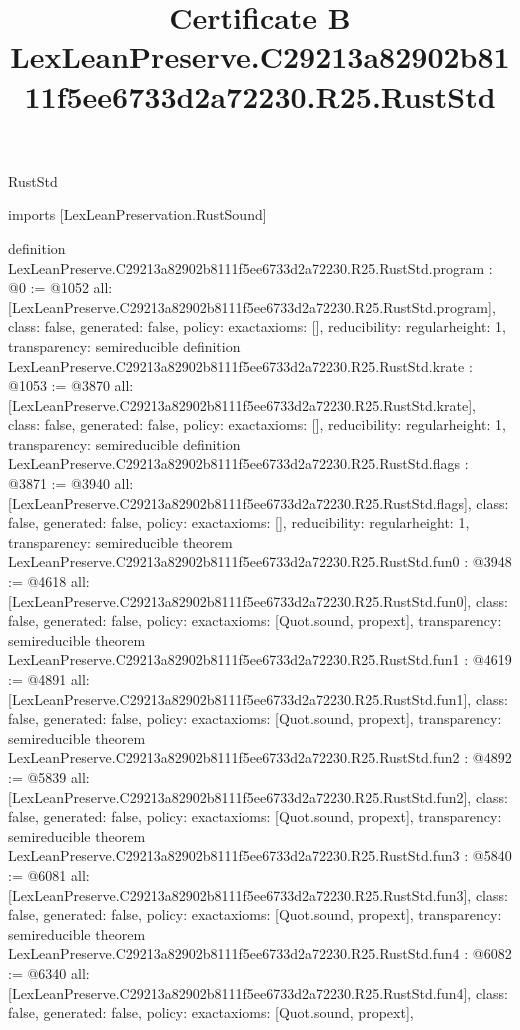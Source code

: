 \begin{lexlean}{RustStd}
\title{Certificate B LexLeanPreserve.C29213a82902b8111f5ee6733d2a72230.R25.RustStd}
\begin{coremodule}
imports [LexLeanPreservation.RustSound]

definition LexLeanPreserve.C29213a82902b8111f5ee6733d2a72230.R25.RustStd.program : @0 := @1052 {
  all: [LexLeanPreserve.C29213a82902b8111f5ee6733d2a72230.R25.RustStd.program],
  class: false,
  generated: false,
  policy: exact{axioms: []},
  reducibility: regular{height: 1},
  transparency: semireducible
}
definition LexLeanPreserve.C29213a82902b8111f5ee6733d2a72230.R25.RustStd.krate : @1053 := @3870 {
  all: [LexLeanPreserve.C29213a82902b8111f5ee6733d2a72230.R25.RustStd.krate],
  class: false,
  generated: false,
  policy: exact{axioms: []},
  reducibility: regular{height: 1},
  transparency: semireducible
}
definition LexLeanPreserve.C29213a82902b8111f5ee6733d2a72230.R25.RustStd.flags : @3871 := @3940 {
  all: [LexLeanPreserve.C29213a82902b8111f5ee6733d2a72230.R25.RustStd.flags],
  class: false,
  generated: false,
  policy: exact{axioms: []},
  reducibility: regular{height: 1},
  transparency: semireducible
}
theorem LexLeanPreserve.C29213a82902b8111f5ee6733d2a72230.R25.RustStd.fun0 : @3948 := @4618 {
  all: [LexLeanPreserve.C29213a82902b8111f5ee6733d2a72230.R25.RustStd.fun0],
  class: false,
  generated: false,
  policy: exact{axioms: [Quot.sound, propext]},
  transparency: semireducible
}
theorem LexLeanPreserve.C29213a82902b8111f5ee6733d2a72230.R25.RustStd.fun1 : @4619 := @4891 {
  all: [LexLeanPreserve.C29213a82902b8111f5ee6733d2a72230.R25.RustStd.fun1],
  class: false,
  generated: false,
  policy: exact{axioms: [Quot.sound, propext]},
  transparency: semireducible
}
theorem LexLeanPreserve.C29213a82902b8111f5ee6733d2a72230.R25.RustStd.fun2 : @4892 := @5839 {
  all: [LexLeanPreserve.C29213a82902b8111f5ee6733d2a72230.R25.RustStd.fun2],
  class: false,
  generated: false,
  policy: exact{axioms: [Quot.sound, propext]},
  transparency: semireducible
}
theorem LexLeanPreserve.C29213a82902b8111f5ee6733d2a72230.R25.RustStd.fun3 : @5840 := @6081 {
  all: [LexLeanPreserve.C29213a82902b8111f5ee6733d2a72230.R25.RustStd.fun3],
  class: false,
  generated: false,
  policy: exact{axioms: [Quot.sound, propext]},
  transparency: semireducible
}
theorem LexLeanPreserve.C29213a82902b8111f5ee6733d2a72230.R25.RustStd.fun4 : @6082 := @6340 {
  all: [LexLeanPreserve.C29213a82902b8111f5ee6733d2a72230.R25.RustStd.fun4],
  class: false,
  generated: false,
  policy: exact{axioms: [Quot.sound, propext]},
}
\end{coremodule}
\end{lexlean}
